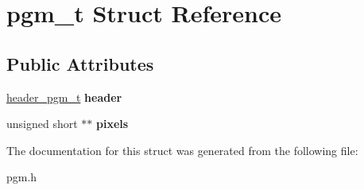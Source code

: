 \hypertarget{structpgm__t}{}\section{pgm\+\_\+t Struct Reference}
\label{structpgm__t}
\subsection*{Public Attributes}
\begin{DoxyCompactItemize}
\item 
\hypertarget{structpgm__t_a8e1709bba2693bc7da1afc25d7c5eb4b}{}\hyperlink{structheader__pgm__t}{header\+\_\+pgm\+\_\+t} {\bfseries header}\label{structpgm__t_a8e1709bba2693bc7da1afc25d7c5eb4b}

\item 
\hypertarget{structpgm__t_a452d2f4dd22b4b515812ce3f6676649d}{}unsigned short $\ast$$\ast$ {\bfseries pixels}\label{structpgm__t_a452d2f4dd22b4b515812ce3f6676649d}

\end{DoxyCompactItemize}


The documentation for this struct was generated from the following file\+:\begin{DoxyCompactItemize}
\item 
pgm.\+h\end{DoxyCompactItemize}
